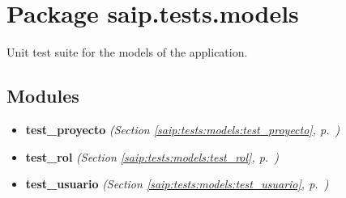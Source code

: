 %
%
%


\section{Package saip.tests.models}

    \label{saip:tests:models}
Unit test suite for the models of the application.



\subsection{Modules}

\begin{itemize}
\setlength{\parskip}{0ex}
\item \textbf{test\_proyecto}
  \textit{(Section \ref{saip:tests:models:test_proyecto}, p.~\pageref{saip:tests:models:test_proyecto})}

\item \textbf{test\_rol}
  \textit{(Section \ref{saip:tests:models:test_rol}, p.~\pageref{saip:tests:models:test_rol})}

\item \textbf{test\_usuario}
  \textit{(Section \ref{saip:tests:models:test_usuario}, p.~\pageref{saip:tests:models:test_usuario})}

\end{itemize}




